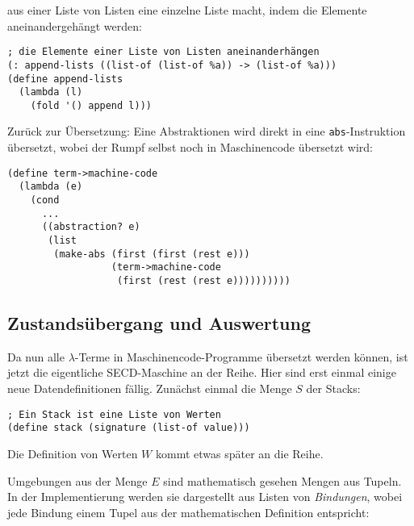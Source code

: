 aus einer Liste von Listen eine einzelne Liste macht, indem die
Elemente aneinandergehängt werden:
%
\begin{verbatim}
; die Elemente einer Liste von Listen aneinanderhängen
(: append-lists ((list-of (list-of %a)) -> (list-of %a)))
(define append-lists
  (lambda (l)
    (fold '() append l)))
\end{verbatim}
%
Zurück zur Übersetzung: Eine Abstraktionen wird direkt in eine
\texttt{abs}-Instruktion übersetzt, wobei der Rumpf selbst
noch in Maschinencode übersetzt wird:
%
\begin{verbatim}
(define term->machine-code
  (lambda (e)
    (cond
      ...
      ((abstraction? e)
       (list
        (make-abs (first (first (rest e)))
                  (term->machine-code
                   (first (rest (rest e))))))))))
\end{verbatim}
%

\subsection{Zustandsübergang und Auswertung}
\label{sec:secd-transition}

Da nun alle $\lambda$-Terme in Maschinencode-Programme übersetzt
werden können, ist jetzt die eigentliche SECD-Maschine an der Reihe.
Hier sind erst einmal einige neue Datendefinitionen fällig.  Zunächst
einmal die Menge $S$ der Stacks:
%
\begin{verbatim}
; Ein Stack ist eine Liste von Werten
(define stack (signature (list-of value)))
\end{verbatim}
%
Die Definition von Werten $W$ kommt etwas später an die Reihe.

Umgebungen aus der Menge $E$ sind mathematisch gesehen Mengen aus
Tupeln.  In der Implementierung werden sie dargestellt aus Listen von
\textit{Bindungen}, wobei jede Bindung einem Tupel aus
der mathematischen Definition entspricht:

